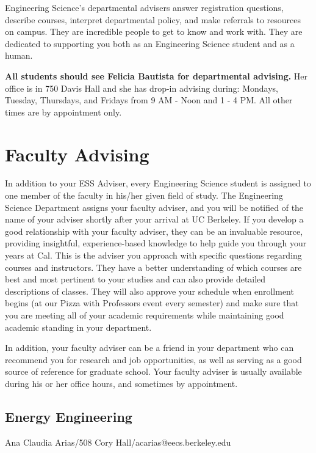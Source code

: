 Engineering Science’s departmental advisers answer registration questions, describe courses, interpret departmental policy, and make referrals to resources on campus. They are incredible people to get to know and work with. They are dedicated to supporting you both as an Engineering Science student and as a human.

\textbf{All students should see Felicia Bautista for departmental advising.} Her office is in 750 Davis Hall and she has drop-in advising during: Mondays, Tuesday, Thursdays, and Fridays from 9 AM - Noon and 1 - 4 PM. All other times are by appointment only.


\section*{Faculty Advising}

In addition to your ESS Adviser, every Engineering Science student is assigned to one member of the faculty in his/her given field of study.
The Engineering Science Department assigns your faculty adviser, and you will be notified of the name of your adviser shortly after your arrival at UC Berkeley. If you develop a good relationship with your faculty adviser, they can be an invaluable resource, providing insightful, experience-based knowledge to help guide you through your years at Cal. This is the adviser you approach with specific questions regarding courses and instructors. They have a better understanding of which courses are best and most pertinent to your studies and can also provide detailed descriptions of classes. They will also approve your schedule when enrollment begins (at our Pizza with Professors event every semester) and make sure that you are meeting all of your academic requirements while maintaining good academic standing in your department.

In addition, your faculty adviser can be a friend in your department who can recommend you for research and job opportunities, as well as serving as a good source of reference for graduate school. Your faculty adviser is usually available during his or her office hours, and sometimes by appointment.

\subsection*{Energy Engineering}

Ana Claudia Arias/508 Cory Hall/{\selectfont acarias@eecs.berkeley.edu}

